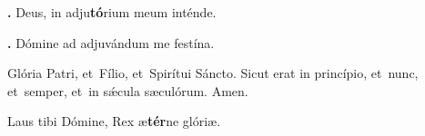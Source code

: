 
\textbf{\Vbar.} Deus, in adju\textbf{tó}rium meum inténde. 

\textbf{\Rbar.} Dómine ad adjuvándum me festína.

Glória Patri, et~Fílio, et~Spirítui Sáncto.
Sicut erat in princípio, et~nunc, et~semper, et~in s\'{\ae}cula sæculórum. Amen.

Laus tibi Dómine, Rex æ\textbf{tér}ne glóriæ.


